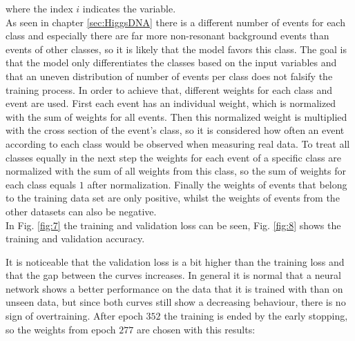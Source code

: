 
where the index $i$ indicates the variable. \\

As seen in chapter \ref{sec:HiggsDNA} there is a different number of events for each class and especially there are far more non-resonant background events than events of other classes, so it is likely
that the model favors this class. The goal is that the model only differentiates the classes based on the input variables and that an uneven distribution of number of events per class does not 
falsify the training process. In order to achieve that, different weights for each class and event are used.
First each event has an individual weight, which is normalized with the sum of weights for all events. Then this normalized weight is multiplied with the cross section of the event's class,
so it is considered how often an event according to each class would be observed when measuring real data. To treat all classes equally in the next step the weights for each event of a specific class are normalized
with the sum of all weights from this class, so the sum of weights for each class equals $1$ after normalization. Finally the weights of events that belong to the training data set are only positive, whilst
the weights of events from the other datasets can also be negative. \\

In Fig. \ref{fig:7} the training and validation loss can be seen, Fig. \ref{fig:8} shows the training and validation accuracy.


It is noticeable that the validation loss is a bit higher than the training loss and that the gap between the curves increases. In general it is normal that a neural network shows a better performance
on the data that it is trained with than on unseen data, but since both curves still show a decreasing behaviour, there is no sign of overtraining. 
After epoch $352$ the training is ended by the early stopping, so the weights from epoch $277$ are chosen with this results:


